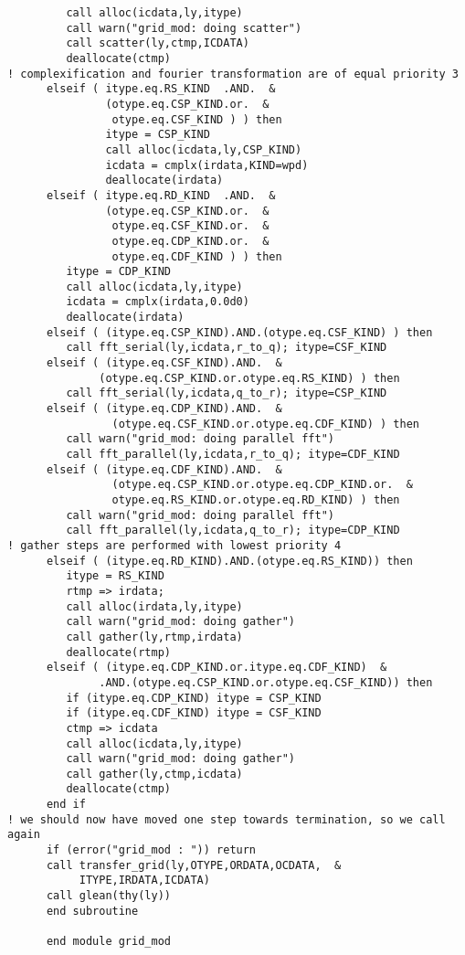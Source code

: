 \begin{verbatim}
         call alloc(icdata,ly,itype)
         call warn("grid_mod: doing scatter")
         call scatter(ly,ctmp,ICDATA)
         deallocate(ctmp)
! complexification and fourier transformation are of equal priority 3
      elseif ( itype.eq.RS_KIND  .AND.  &
               (otype.eq.CSP_KIND.or.  &
                otype.eq.CSF_KIND ) ) then
               itype = CSP_KIND
               call alloc(icdata,ly,CSP_KIND)
               icdata = cmplx(irdata,KIND=wpd)
               deallocate(irdata)
      elseif ( itype.eq.RD_KIND  .AND.  &
               (otype.eq.CSP_KIND.or.  &
                otype.eq.CSF_KIND.or.  &
                otype.eq.CDP_KIND.or.  &
                otype.eq.CDF_KIND ) ) then
         itype = CDP_KIND
         call alloc(icdata,ly,itype)
         icdata = cmplx(irdata,0.0d0)
         deallocate(irdata)
      elseif ( (itype.eq.CSP_KIND).AND.(otype.eq.CSF_KIND) ) then
         call fft_serial(ly,icdata,r_to_q); itype=CSF_KIND
      elseif ( (itype.eq.CSF_KIND).AND.  &
              (otype.eq.CSP_KIND.or.otype.eq.RS_KIND) ) then
         call fft_serial(ly,icdata,q_to_r); itype=CSP_KIND
      elseif ( (itype.eq.CDP_KIND).AND.  &
                (otype.eq.CSF_KIND.or.otype.eq.CDF_KIND) ) then
         call warn("grid_mod: doing parallel fft")
         call fft_parallel(ly,icdata,r_to_q); itype=CDF_KIND
      elseif ( (itype.eq.CDF_KIND).AND.  &
                (otype.eq.CSP_KIND.or.otype.eq.CDP_KIND.or.  &
                otype.eq.RS_KIND.or.otype.eq.RD_KIND) ) then
         call warn("grid_mod: doing parallel fft")
         call fft_parallel(ly,icdata,q_to_r); itype=CDP_KIND
! gather steps are performed with lowest priority 4
      elseif ( (itype.eq.RD_KIND).AND.(otype.eq.RS_KIND)) then
         itype = RS_KIND
         rtmp => irdata; 
         call alloc(irdata,ly,itype)
         call warn("grid_mod: doing gather")
         call gather(ly,rtmp,irdata)
         deallocate(rtmp)
      elseif ( (itype.eq.CDP_KIND.or.itype.eq.CDF_KIND)  &
              .AND.(otype.eq.CSP_KIND.or.otype.eq.CSF_KIND)) then
         if (itype.eq.CDP_KIND) itype = CSP_KIND
         if (itype.eq.CDF_KIND) itype = CSF_KIND
         ctmp => icdata
         call alloc(icdata,ly,itype)
         call warn("grid_mod: doing gather")
         call gather(ly,ctmp,icdata)
         deallocate(ctmp)
      end if
! we should now have moved one step towards termination, so we call again
      if (error("grid_mod : ")) return
      call transfer_grid(ly,OTYPE,ORDATA,OCDATA,  &
           ITYPE,IRDATA,ICDATA)
      call glean(thy(ly))
      end subroutine

      end module grid_mod
\end{verbatim}




